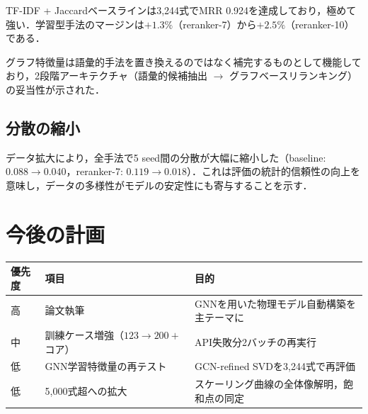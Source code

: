 \documentclass[11pt,a4paper]{ltjsarticle}
\begin{document}
TF-IDF + Jaccardベースラインは3,244式でMRR 0.924を達成しており，極めて強い．学習型手法のマージンは$+1.3\%$（reranker-7）から$+2.5\%$（reranker-10）である．

グラフ特徴量は語彙的手法を置き換えるのではなく補完するものとして機能しており，2段階アーキテクチャ（語彙的候補抽出 $\to$ グラフベースリランキング）の妥当性が示された．

\subsection{分散の縮小}

データ拡大により，全手法で5 seed間の分散が大幅に縮小した（baseline: $0.088 \to 0.040$，reranker-7: $0.119 \to 0.018$）．これは評価の統計的信頼性の向上を意味し，データの多様性がモデルの安定性にも寄与することを示す．

\section{今後の計画}

\begin{table}[h]
\centering
\begin{tabular}{llp{8cm}}
\toprule
優先度 & 項目 & 目的 \\
\midrule
高 & 論文執筆 & GNNを用いた物理モデル自動構築を主テーマに \\
中 & 訓練ケース増強（$123 \to 200+$コア） & API失敗分2バッチの再実行 \\
低 & GNN学習特徴量の再テスト & GCN-refined SVDを3,244式で再評価 \\
低 & 5,000式超への拡大 & スケーリング曲線の全体像解明，飽和点の同定 \\
\bottomrule
\end{tabular}
\end{table}
\end{document}
